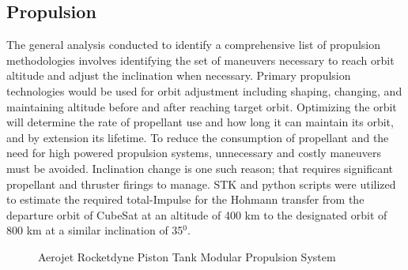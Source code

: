 \subsection{Propulsion }
The general analysis conducted to identify a comprehensive list of propulsion methodologies involves identifying the set of maneuvers necessary to reach orbit altitude and adjust the inclination when necessary. Primary propulsion technologies would be used for orbit adjustment including shaping, changing, and maintaining altitude before and after reaching target orbit. Optimizing the orbit will determine the rate of propellant use and how long it can maintain its orbit, and by extension its lifetime. To reduce the consumption of propellant and the need for high powered propulsion systems, unnecessary and costly maneuvers must be avoided. Inclination change is one such reason; that requires significant propellant and thruster firings to manage. STK and python scripts were utilized to estimate the required total-Impulse for the Hohmann transfer from the departure orbit of CubeSat at an altitude of 400 km to the designated orbit of 800 km at a similar inclination of 35$^0$.
\begin{figure}
    \centering
    \label{fig:p1}
    \qquad
    \label{fig:p2}
    \caption{Aerojet Rocketdyne Piston Tank Modular Propulsion System}
    \label{fig:prop}
\end{figure}

